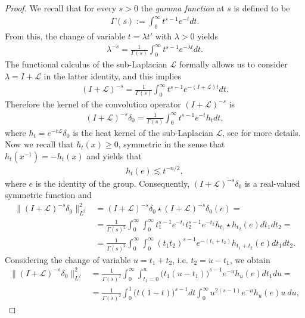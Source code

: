 \documentclass[12pt,oneside,a4paper]{book}
\numberwithin{equation}{section}     %
\theoremstyle{plain}
\theoremstyle{definition}
\newcommand{\slp}{{\mathcal L}}
\begin{document}
\begin{proof}
	We recall that for every $s>0$ the \textit{gamma function} at $s$ is defined to be
	\begin{align*}
	\Gamma(s):=\int_{0}^\infty t^{s-1}e^{-t}dt.
	\end{align*}	
	From this, the change of variable $t=\lambda t'$ with $\lambda>0$ yields 
	\begin{align*}
	\lambda^{-s}=\frac{1}{\Gamma(s)}\int_{0}^\infty t^{s-1}e^{-\lambda t}dt.
	\end{align*}
	The functional calculus of the sub-Laplacian $\slp$ formally allows us to consider $\lambda=I+\slp$ in the latter identity, and this implies 
	\begin{align*}
	(I+\slp)^{-s}=\frac{1}{\Gamma(s)}\int_0^\infty t^{s-1}e^{-(I+\slp)t}dt.
	\end{align*}
	Therefore the kernel of the convolution operator $(I+\slp)^{-s}$ is
	\begin{align*}
	(I+\slp)^{-s}\delta_0=\frac{1}{\Gamma(s)}\int_0^\infty t^{s-1}e^{-t}h_t dt,
	\end{align*}
	where $h_t=e^{-t\slp}\delta_0$ is the heat kernel of the sub-Laplacian $\slp$, see \cite{VSC1992} for more details. Now we recall that $h_t(x)\geq 0$, symmetric in the sense that $h_t(x^{-1})=-h_t(x)$  and \cite[VIII 2.2 Proposition]{VSC1992} yields that 
	\begin{align*}
	h_t(e)\lesssim t^{-n/2}, 
	\end{align*}
	where $e$ is the identity of the group. Consequently, $(I+\slp)^{-s}\delta_0$ is a real-valued symmetric function and
	\begin{align*}
	\|(I+\slp)^{-s}\delta_0\|_{L^2}^2&=(I+\slp)^{-s}\delta_0\star (I+\slp)^{-s}\delta_0(e)=\\
	&=\frac{1}{\Gamma(s)^2}\int_0^\infty \int_0^\infty t_1^{s-1}e^{-t_1}t_2^{s-1}e^{-t_2}h_{t_1}\star h_{t_2}(e)dt_1dt_2= \\
	&=  \frac{1}{\Gamma(s)^2}\int_0^\infty \int_0^\infty (t_1t_2)^{s-1}e^{-(t_1+t_2)}h_{t_1+t_2}(e)dt_1dt_2.
	\end{align*}
	Considering the change of variable $u=t_1+t_2$, i.e. $t_2=u-t_1$, we obtain 
	\begin{align*}
	\|(I+\slp)^{-s}\delta_0\|_{L^2}^2&=\frac{1}{\Gamma(s)^2}\int_0^\infty \int_{t_1=0}^u \big(t_1(u-t_1)\big)^{s-1}e^{-u}h_u(e)dt_1du=\\
	&=\frac{1}{\Gamma(s)^2}\int_0^1\big(t(1-t)\big)^{s-1}dt\int_0^\infty u^{2(s-1)}e^{-u}h_u(e)u~du,
	\end{align*}

\end{proof}
\end{document}
